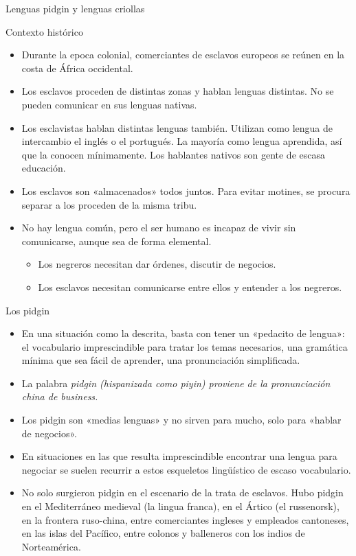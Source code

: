 \documentclass[handout]{beamer}
\begin{document}
\begin{frame}{}
\begin{center}
\LARGE Lenguas pidgin y lenguas criollas 
\end{center}
\end{frame}


\begin{frame}{Contexto histórico}
\begin{itemize}
	\item Durante la epoca colonial, comerciantes de esclavos europeos se reúnen en la costa de África occidental.
	\item Los esclavos proceden de distintas zonas y hablan lenguas distintas. No se pueden comunicar en sus lenguas nativas.
	\item Los esclavistas hablan distintas lenguas también. Utilizan como lengua de intercambio el inglés o el portugués. La mayoría como lengua aprendida, así que la conocen mínimamente. Los hablantes nativos son gente de escasa educación. 
	\item Los esclavos son «almacenados» todos juntos. Para evitar motines, se procura separar a los proceden de la misma tribu.
	\item No hay lengua común, pero el ser humano es incapaz de vivir sin comunicarse, aunque sea de forma elemental.
		\begin{itemize}
			\item Los negreros necesitan dar órdenes, discutir de negocios.
			\item Los esclavos necesitan comunicarse entre ellos y entender a los negreros.
		\end{itemize}
\end{itemize}

\end{frame}

\begin{frame}{Los pidgin}
\begin{itemize}
	\item En una situación como la descrita, basta con tener un «pedacito de lengua»: el vocabulario imprescindible para tratar los temas necesarios, una gramática mínima que sea fácil de aprender, una pronunciación simplificada.
	\item La palabra \it{pidgin} (hispanizada como piyin) proviene de la pronunciación china de \it{business}.  
	\item Los pidgin son «medias lenguas» y no sirven para mucho, solo para «hablar de negocios».
	\item En situaciones en las que resulta imprescindible encontrar una lengua para negociar se suelen recurrir a estos esqueletos lingüístico de escaso vocabulario.
	\item No solo surgieron pidgin en el escenario de la trata de esclavos. Hubo pidgin en el Mediterráneo medieval (la lingua franca), en el Ártico (el russenorsk), en la frontera ruso-china, entre comerciantes ingleses y empleados cantoneses, en las islas del Pacífico, entre colonos y balleneros con los indios de Norteamérica.
\end{itemize}

\end{frame}
\end{document}
